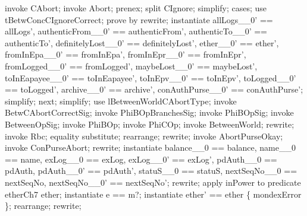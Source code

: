 \begin{LPScript}\begin{zproof}[tBetwConcCAbortCorrect]
    invoke CAbort;
    invoke Abort;
    prenex;
    split CIgnore;
    simplify;
    cases;
        use tBetwConcCIgnoreCorrect;
        prove by rewrite;
        instantiate allLogs\_\_0' == allLogs', authenticFrom\_\_0' == authenticFrom',
            authenticTo\_\_0' == authenticTo', definitelyLost\_\_0' == definitelyLost',
            ether\_\_0' == ether', fromInEpa\_\_0' == fromInEpa',
            fromInEpr\_\_0' == fromInEpr', fromLogged\_\_0' == fromLogged',
            maybeLost\_\_0' == maybeLost', toInEapayee\_\_0' == toInEapayee',
            toInEpv\_\_0' == toInEpv', toLogged\_\_0' == toLogged',
            archive\_\_0' == archive', conAuthPurse\_\_0' == conAuthPurse';
        simplify;
    next;
        simplify;
        use lBetweenWorldCAbortType;
        invoke BetwCAbortCorrectSig;
        invoke PhiBOpBranchesSig;
        invoke PhiBOpSig;
        invoke BetweenOpSig;
        invoke PhiBOp;
        invoke PhiCOp;
        invoke \Delta BetweenWorld;
        rewrite;
        invoke Rbc;
        equality substitute;
        rearrange;
        rewrite;
        invoke AbortPurseOkay;
        invoke \Xi ConPurseAbort;
        rewrite;
        instantiate balance\_\_0 == balance, name\_\_0 == name,
            exLog\_\_0 == exLog, exLog\_\_0' == exLog',
            pdAuth\_\_0 == pdAuth, pdAuth\_\_0' == pdAuth',
            statuS\_\_0 == statuS, nextSeqNo\_\_0 == nextSeqNo,
            nextSeqNo\_\_0' == nextSeqNo';
        rewrite;
        apply inPower to predicate etherCh7 \in \power ether;
        instantiate e == m?;
        instantiate ether' == ether \cup \{ mondexError \};
        rearrange;
        rewrite;

\end{zproof}
\end{LPScript}
